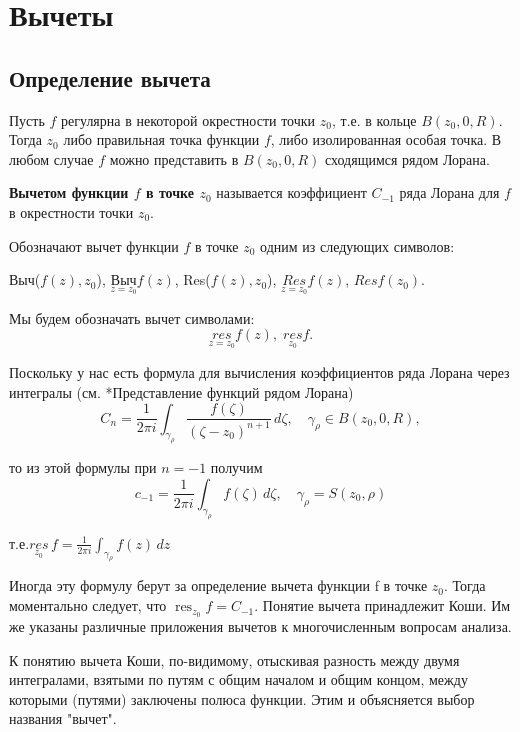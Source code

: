\documentclass[a4paper, 12pt]{report}
\DeclareMathOperator*{\res}{res}
\begin{document}
\section{Вычеты}

\subsection{Определение вычета} 

Пусть $f$ регулярна в некоторой окрестности точки $z_0$, т.е. в кольце $B(z_0, 0, R)$. Тогда $z_0$
либо правильная точка функции $f$, либо изолированная особая точка. В любом случае $f$
можно представить в $B(z_0, 0, R)$ сходящимся рядом Лорана.
\par\bigskip

\textbf{Вычетом функции $f$ в точке $z_0$} называется коэффициент $C_{-1}$ ряда Лорана для $f$ в окрестности точки $z_0$.
\par\bigskip

Обозначают вычет функции $f$ в точке $z_0$ одним из следующих символов:
\begin{center}
    {Выч($f(z), z_0$),\; $\underset{z=z_0}{\text{Выч}}f(z)$,\; Res($f(z), z_0$),\; $\underset{z=z_0}{Res}f(z)$,\; $Res f(z_0)$. }
\end{center}

Мы будем обозначать вычет символами:
$$\underset{z=z_0}{res}f(z),\; \underset{z_0}{res}f.$$

Поскольку у нас есть формула для вычисления коэффициентов ряда Лорана через интегралы (см. *Представление функций рядом Лорана)
$$C_n = \frac{1}{2\pi i}\int_{\gamma_{\rho }}^{ } \frac{f(\zeta  )}{(\zeta - z_0 )^{n+1}} \,d\zeta,\quad \gamma_{\rho} \in B(z_0, 0, R), $$

то из этой формулы при $n = -1$ получим
$$c_{-1} = \frac{1}{2\pi i}\int_{\gamma_{\rho }}^{ } f(\zeta  ) \,d\zeta,\quad \gamma_{\rho} = S(z_0, \rho )$$
\begin{center}
    т.е.\quad $\overset{}{\underset{z_0}{res}}\,f = \frac{1}{2\pi i}\int_{\gamma_{\rho }}^{ } f(z) \,dz$
\end{center}


Иногда эту формулу берут за определение вычета функции f в точке $z_0$. 
Тогда моментально следует, что $\displaystyle \res_{z_0} f = C_{-1}$.
Понятие вычета принадлежит Коши. Им же указаны различные приложения вычетов к многочисленным вопросам анализа.

К понятию вычета Коши, по-видимому, отыскивая разность между двумя интегралами, взятыми
по путям с общим началом и общим концом, между которыми (путями) 
заключены полюса функции. Этим и объясняется выбор названия "вычет".
\end{document}
